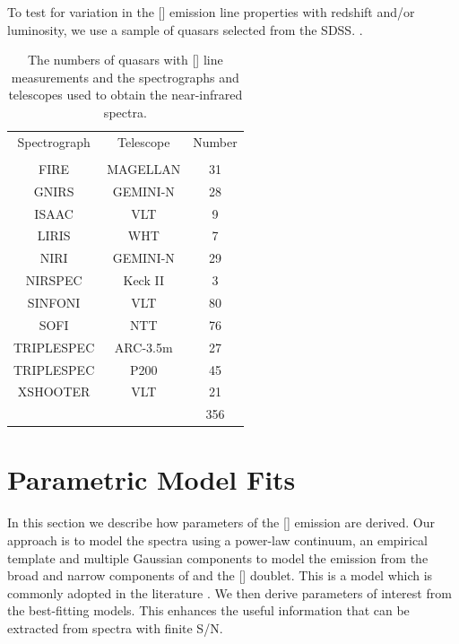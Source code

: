 To test for variation in the [] emission line properties with redshift and/or luminosity, we use a sample of quasars selected from the \ac{SDSS}. 
. 


\begin{table}
  \centering
  \small 
  \caption{The numbers of quasars with [] line measurements and the spectrographs and telescopes used to obtain the near-infrared spectra.}
  \label{tab:specnums_ch4}
    \begin{tabular}{ccc} 
    \hline
    Spectrograph & Telescope & Number \\
                 &           & \\
    \hline
    FIRE         & MAGELLAN  & 31 \\
    GNIRS        & GEMINI-N  & 28 \\
    ISAAC        & VLT       & 9 \\
    LIRIS        & WHT       & 7 \\
    NIRI         & GEMINI-N  & 29 \\
    NIRSPEC      & Keck II   & 3 \\
    SINFONI      & VLT       & 80 \\
    SOFI         & NTT       & 76 \\
    TRIPLESPEC   & ARC-3.5m  & 27 \\
    TRIPLESPEC   & P200      & 45 \\
    XSHOOTER     & VLT       & 21 \\
    \hline
    & & 356 \\
    \hline
    \end{tabular}
\end{table} 

\section{Parametric Model Fits}

In this section we describe how parameters of the [] emission are derived. 
Our approach is to model the spectra using a power-law continuum, an empirical  template and multiple Gaussian components to model the emission from the broad and narrow components of \hb and the [] doublet.
This is a model which is commonly adopted in the literature \citep[e.g.][]{shen11}. 
We then derive parameters of interest from the best-fitting models. 
This enhances the useful information that can be extracted from spectra with finite \ac{S/N}. 

